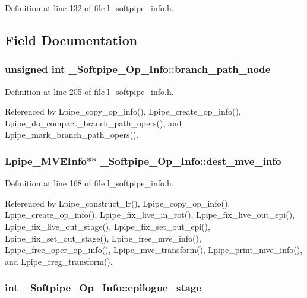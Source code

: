 Definition at line 132 of file l\_\-softpipe\_\-info.h.

\subsection{Field Documentation}
\subsubsection{\setlength{\rightskip}{0pt plus 5cm}unsigned int \bf{\_\-Softpipe\_\-Op\_\-Info::branch\_\-path\_\-node}}\label{struct__Softpipe__Op__Info_7bee54feda7a0bfb08b607ed1515b812}




Definition at line 205 of file l\_\-softpipe\_\-info.h.

Referenced by Lpipe\_\-copy\_\-op\_\-info(), Lpipe\_\-create\_\-op\_\-info(), Lpipe\_\-do\_\-compact\_\-branch\_\-path\_\-opers(), and Lpipe\_\-mark\_\-branch\_\-path\_\-opers().
\subsubsection{\setlength{\rightskip}{0pt plus 5cm}\bf{Lpipe\_\-MVEInfo}$\ast$$\ast$ \bf{\_\-Softpipe\_\-Op\_\-Info::dest\_\-mve\_\-info}}\label{struct__Softpipe__Op__Info_416db2ab0ba42b6e793e89a903ae2105}




Definition at line 168 of file l\_\-softpipe\_\-info.h.

Referenced by Lpipe\_\-construct\_\-lr(), Lpipe\_\-copy\_\-op\_\-info(), Lpipe\_\-create\_\-op\_\-info(), Lpipe\_\-fix\_\-live\_\-in\_\-rot(), Lpipe\_\-fix\_\-live\_\-out\_\-epi(), Lpipe\_\-fix\_\-live\_\-out\_\-stage(), Lpipe\_\-fix\_\-set\_\-out\_\-epi(), Lpipe\_\-fix\_\-set\_\-out\_\-stage(), Lpipe\_\-free\_\-mve\_\-info(), Lpipe\_\-free\_\-oper\_\-op\_\-info(), Lpipe\_\-mve\_\-transform(), Lpipe\_\-print\_\-mve\_\-info(), and Lpipe\_\-rreg\_\-transform().
\subsubsection{\setlength{\rightskip}{0pt plus 5cm}int \bf{\_\-Softpipe\_\-Op\_\-Info::epilogue\_\-stage}}\label{struct__Softpipe__Op__Info_ccadd541b4797347084630474a27a946}




